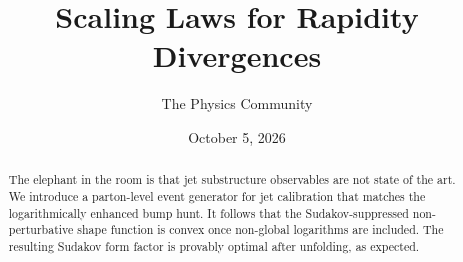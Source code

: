 \documentclass[11pt]{article}
\title{Scaling Laws for Rapidity Divergences}
\author{The Physics Community}
\date{October 5, 2026}
\numberwithin{equation}{section}
\theoremstyle{definition}
\theoremstyle{remark}
\begin{document}
\maketitle
\begin{abstract}
The elephant in the room is that jet substructure observables are not
state of the art. We introduce a parton-level event generator for jet
calibration that matches the logarithmically enhanced bump hunt. It
follows that the Sudakov-suppressed non-perturbative shape function is
convex once non-global logarithms are included. The resulting Sudakov
form factor is provably optimal after unfolding, as expected.
\end{abstract}
\tableofcontents




\nocite{*}


\end{document}
